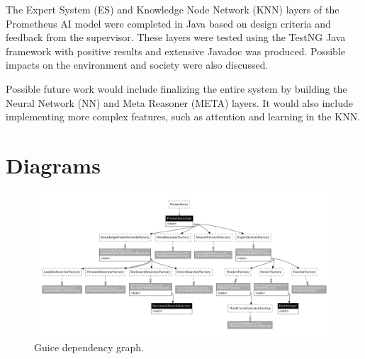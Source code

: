 \documentclass[titlepage,11pt]{article}
\begin{document}
The Expert System (ES) and Knowledge Node Network (KNN) layers of the Prometheus AI model were completed in Java based on design criteria and feedback from the supervisor. These layers were tested using the TestNG Java framework with positive results and extensive Javadoc was produced. Possible impacts on the environment and society were also discussed.

Possible future work would include finalizing the entire system by building the Neural Network (NN) and Meta Reasoner (META) layers. It would also include implementing more complex features, such as attention and learning in the KNN.

\clearpage
\onecolumn

{}


\appendix
\renewcommand\thefigure{\thesection.\arabic{figure}}
\setcounter{figure}{0}

\clearpage
	\section{Diagrams}
	\label{sec:diagrams}
	\begin{figure}[!htb]
		\includegraphics[width=\columnwidth]{figures/guice_graph.pdf}
		\caption{Guice dependency graph.}
		\label{fig:guice_graph}
	\end{figure}
\end{document}
